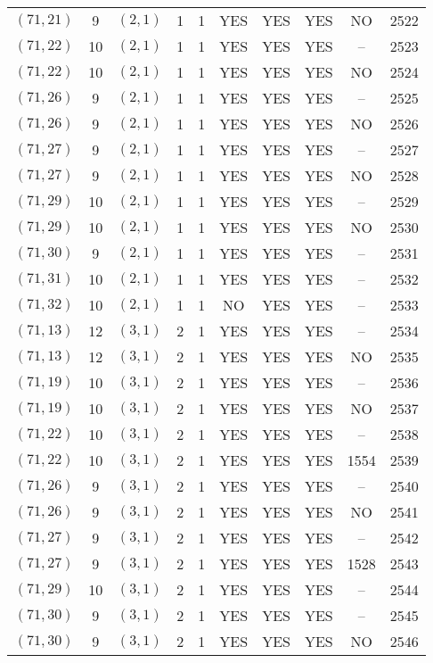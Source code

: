 \begin{longtable}{|c|c|c|c|c|c|c|c|c|c|}
$(71, 21)$ & 9 & $(2, 1)$ & 1 & 1 & YES & YES & YES & NO & 2522\\
$(71, 22)$ & 10 & $(2, 1)$ & 1 & 1 & YES & YES & YES & -- & 2523\\
$(71, 22)$ & 10 & $(2, 1)$ & 1 & 1 & YES & YES & YES & NO & 2524\\
$(71, 26)$ & 9 & $(2, 1)$ & 1 & 1 & YES & YES & YES & -- & 2525\\
$(71, 26)$ & 9 & $(2, 1)$ & 1 & 1 & YES & YES & YES & NO & 2526\\
$(71, 27)$ & 9 & $(2, 1)$ & 1 & 1 & YES & YES & YES & -- & 2527\\
$(71, 27)$ & 9 & $(2, 1)$ & 1 & 1 & YES & YES & YES & NO & 2528\\
$(71, 29)$ & 10 & $(2, 1)$ & 1 & 1 & YES & YES & YES & -- & 2529\\
$(71, 29)$ & 10 & $(2, 1)$ & 1 & 1 & YES & YES & YES & NO & 2530\\
$(71, 30)$ & 9 & $(2, 1)$ & 1 & 1 & YES & YES & YES & -- & 2531\\
$(71, 31)$ & 10 & $(2, 1)$ & 1 & 1 & YES & YES & YES & -- & 2532\\
$(71, 32)$ & 10 & $(2, 1)$ & 1 & 1 & NO & YES & YES & -- & 2533\\
$(71, 13)$ & 12 & $(3, 1)$ & 2 & 1 & YES & YES & YES & -- & 2534\\
$(71, 13)$ & 12 & $(3, 1)$ & 2 & 1 & YES & YES & YES & NO & 2535\\
$(71, 19)$ & 10 & $(3, 1)$ & 2 & 1 & YES & YES & YES & -- & 2536\\
$(71, 19)$ & 10 & $(3, 1)$ & 2 & 1 & YES & YES & YES & NO & 2537\\
$(71, 22)$ & 10 & $(3, 1)$ & 2 & 1 & YES & YES & YES & -- & 2538\\
$(71, 22)$ & 10 & $(3, 1)$ & 2 & 1 & YES & YES & YES & 1554 & 2539\\
$(71, 26)$ & 9 & $(3, 1)$ & 2 & 1 & YES & YES & YES & -- & 2540\\
$(71, 26)$ & 9 & $(3, 1)$ & 2 & 1 & YES & YES & YES & NO & 2541\\
$(71, 27)$ & 9 & $(3, 1)$ & 2 & 1 & YES & YES & YES & -- & 2542\\
$(71, 27)$ & 9 & $(3, 1)$ & 2 & 1 & YES & YES & YES & 1528 & 2543\\
$(71, 29)$ & 10 & $(3, 1)$ & 2 & 1 & YES & YES & YES & -- & 2544\\
$(71, 30)$ & 9 & $(3, 1)$ & 2 & 1 & YES & YES & YES & -- & 2545\\
$(71, 30)$ & 9 & $(3, 1)$ & 2 & 1 & YES & YES & YES & NO & 2546\\

\end{longtable}

